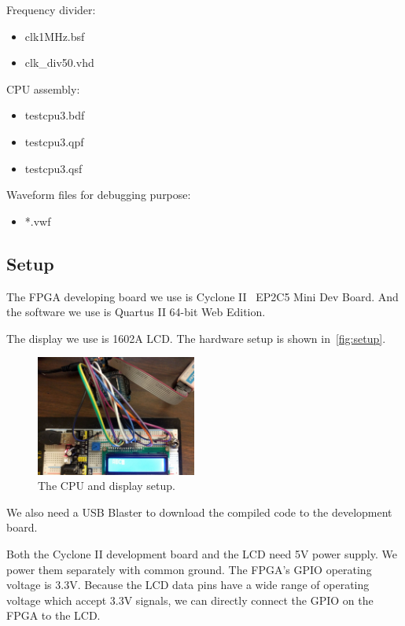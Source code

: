 Frequency divider:
\begin{itemize}
	\item clk1MHz.bsf
	\item clk\_div50.vhd
\end{itemize}


CPU assembly:
\begin{itemize}
	\item testcpu3.bdf
	\item testcpu3.qpf
	\item testcpu3.qsf
\end{itemize}

Waveform files for debugging purpose:
\begin{itemize}
	\item *.vwf
\end{itemize}


\subsection{Setup}
The FPGA developing board we use is Cyclone II~\cite{cyclone2} EP2C5 Mini Dev Board. And the software we use is Quartus II 64-bit Web Edition.

The display we use is 1602A LCD. The hardware setup is shown in~\autoref{fig:setup}.


\begin{figure}[th]
	\includegraphics[width=0.47\textwidth]{figures/setup}
	\centering
	\caption{The CPU and display setup.}
	\label{fig:setup}
\end{figure}

We also need a USB Blaster to download the compiled code to the development board.

Both the Cyclone II development board and the LCD need 5V power supply. We power them separately with common ground. The FPGA's GPIO operating voltage is 3.3V. Because the LCD data pins have a wide range of operating voltage which accept 3.3V signals, we can directly connect the GPIO on the FPGA to the LCD. 
